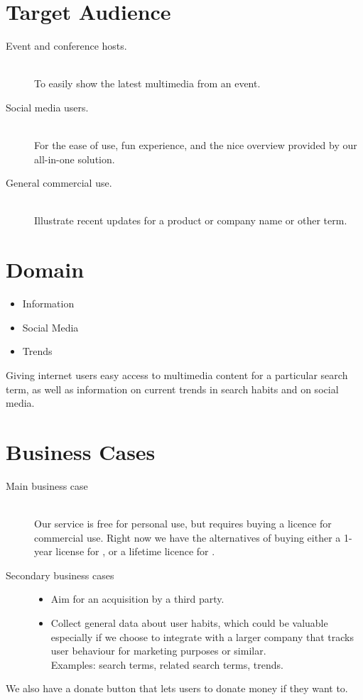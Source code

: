 \section{Target Audience}
\begin{description}
  \item[Event and conference hosts.] \hfill \\
  To easily show the latest multimedia from an event.
  \item[Social media users.] \hfill \\
  For the ease of use, fun experience, and the nice overview provided by our
  all-in-one solution.
  \item[General commercial use.] \hfill \\
  Illustrate recent updates for a product or company name or other term.
\end{description}

\section{Domain}
\begin{itemize}
  \item Information
  \item Social Media
  \item Trends
\end{itemize}
Giving internet users easy access to multimedia content for a particular search
term, as well as information on current trends in search habits and on social
media.

\section{Business Cases}
\begin{description}
  \item[Main business case] \hfill \\
  Our service is free for personal use, but requires buying a licence for
  commercial use. Right now we have the alternatives of buying either a 1-year
  license for , or a lifetime licence for .
  \item[Secondary business cases] \hfill
  \begin{itemize}
    \item Aim for an acquisition by a third party.
    \item Collect general data about user habits, which could be valuable
          especially if we choose to integrate with a larger company that tracks
          user behaviour for marketing purposes or similar. \\
          Examples: search terms, related search terms, trends.
   \end{itemize}
\end{description}
We also have a donate button that lets users to donate money if they want to.

